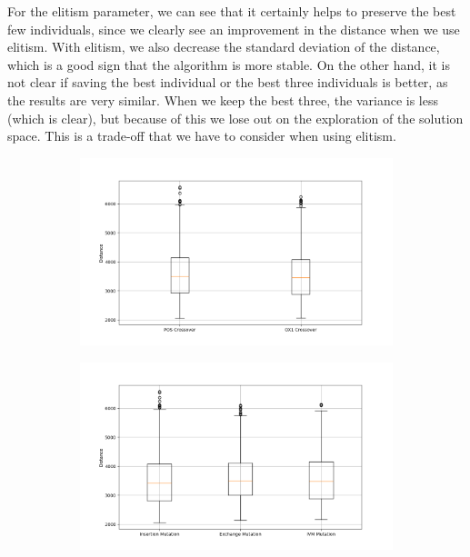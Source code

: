 \documentclass[11pt]{article}
\begin{document}
For the elitism parameter, we can see that it certainly helps to preserve the best few individuals, since we clearly see an improvement in the distance when we use elitism. With elitism, we also decrease the standard deviation of the distance, which is a good sign that the algorithm is more stable. On the other hand, it is not clear if saving the best individual or the best three individuals is better, as the results are very similar. When we keep the best three, the variance is less (which is clear), but because of this we lose out on the exploration of the solution space. This is a trade-off that we have to consider when using elitism.

\begin{figure}[H]
    \centering
    \begin{subfigure}{0.48\textwidth}
        \includegraphics[width=\textwidth]{../results/crossover_method_boxplot.png}
        \label{fig:crossover}
    \end{subfigure}
    \begin{subfigure}{0.48\textwidth}
        \includegraphics[width=\textwidth]{../results/mutation_method_boxplot.png}
        \label{fig:mutation}
    \end{subfigure}
\end{figure}
\end{document}
